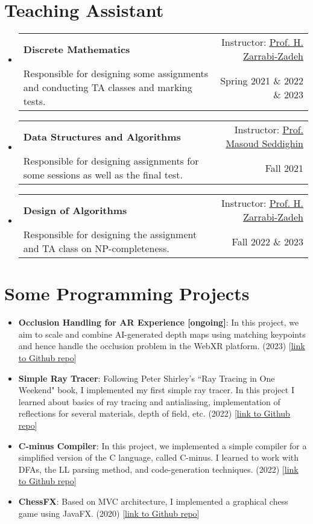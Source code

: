 \documentclass[letterpaper,10.8pt]{article}
\makeatletter
\newcommand{\Href}[2]{\href{#1}{\underline{#2}}}
\newcommand{\resumeItem}[2]{
  \item\small{
    \textbf{#1}{: #2 \vspace{-2pt}}
  }
}
\newcommand{\resumeSubheading}[4]{
  \vspace{-1pt}\item
    \begin{tabular*}{0.97\textwidth}{l@{\extracolsep{\fill}}r}
      \textbf{#1} & #2 \\
      {\small#3} & {\small #4} \\
    \end{tabular*}\vspace{-5pt}
}
\newcommand{\resumeSubHeadingListStart}{\begin{itemize}[leftmargin=*]}
\newcommand{\resumeSubHeadingListEnd}{\end{itemize}}
\makeatother
\begin{document}
\section{Teaching Assistant}

  \resumeSubHeadingListStart
    \resumeSubheading
      {Discrete Mathematics}{Instructor: \Href{http://sharif.edu/~zarrabi/}{Prof. H. Zarrabi-Zadeh}}
      {Responsible for designing some assignments and conducting TA classes and marking tests.}{Spring 2021 \& 2022 \& 2023}

    \resumeSubheading
      {Data Structures and Algorithms}{Instructor: \Href{https://people.mpi-inf.mpg.de/~mseddigh/}{Prof. Masoud Seddighin}}
      {Responsible for designing assignments for some sessions as well as the final test.}{Fall 2021}

    \resumeSubheading
      {Design of Algorithms}{Instructor: \Href{http://sharif.edu/~zarrabi/}{Prof. H. Zarrabi-Zadeh}}
      {Responsible for designing the assignment and TA class on NP-completeness.}{Fall 2022 \& 2023}

  \resumeSubHeadingListEnd


\section{Some Programming Projects}
\resumeSubHeadingListStart

\resumeItem{Occlusion Handling for AR Experience [ongoing]}{In this project, we aim to scale and combine AI-generated depth maps using matching keypoints and hence handle the occlusion problem in the WebXR platform. (2023) [\Href{https://github.com/mahdavifar2002/cv-project/}{link to Github repo}]}

\resumeItem{Simple Ray Tracer}{Following Peter Shirley's ``Ray Tracing in One Weekend" book, I implemented my first simple ray tracer. In this project I learned about basics of ray tracing and  antialiasing, implementation of reflections for several materials, depth of field, etc. (2022) [\Href{https://github.com/mahdavifar2002/ray-tracing-in-one-weekend/}{link to Github repo}]}

\resumeItem{C-minus Compiler}{In this project, we implemented a simple compiler for a simplified version of the C language, called C-minus. I learned to work with DFAs, the LL parsing method, and code-generation techniques. (2022) [\Href{https://github.com/AlipourIm/Compiler_Design_And_Implementation_Project}{link to Github repo}]}

\resumeItem{ChessFX}{Based on MVC architecture, I implemented a graphical chess game using JavaFX. (2020) [\Href{https://github.com/mahdavifar2002/ChessFX}{link to Github repo}]}


\resumeSubHeadingListEnd
\end{document}
